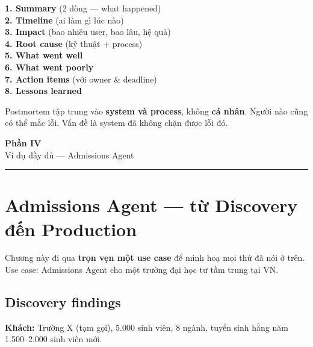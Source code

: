 \documentclass[11pt,a4paper]{article}
\begin{document}
\begin{tpl}[title=Postmortem template]
\textbf{1. Summary} (2 dòng --- what happened)\\
\textbf{2. Timeline} (ai làm gì lúc nào)\\
\textbf{3. Impact} (bao nhiêu user, bao lâu, hệ quả)\\
\textbf{4. Root cause} (kỹ thuật + process)\\
\textbf{5. What went well}\\
\textbf{6. What went poorly}\\
\textbf{7. Action items} (với owner \& deadline)\\
\textbf{8. Lessons learned}
\end{tpl}

\begin{warnbox}[title=Nguyên tắc blameless]
Postmortem tập trung vào \textbf{system và process}, không \textbf{cá nhân}. Người nào
cũng có thể mắc lỗi. Vấn đề là system đã không chặn được lỗi đó.
\end{warnbox}

\clearpage

\begin{center}
\vspace*{0.5em}
{\sffamily\bfseries\Huge\color{ink} Phần IV}\\[0.5em]
{\sffamily\LARGE\color{mid} Ví dụ đầy đủ — Admissions Agent}\\[0.5em]
{\color{mid}\rule{6cm}{0.4pt}}
\end{center}
\vspace{1em}

\section{Admissions Agent — từ Discovery đến Production}

Chương này đi qua \textbf{trọn vẹn một use case} để minh hoạ mọi thứ đã nói ở
trên. Use case: Admissions Agent cho một trường đại học tư tầm trung tại VN.

\subsection{Discovery findings}

\textbf{Khách:} Trường X (tạm gọi), 5.000 sinh viên, 8 ngành, tuyển sinh hằng năm 1.500--2.000 sinh viên mới.
\end{document}
